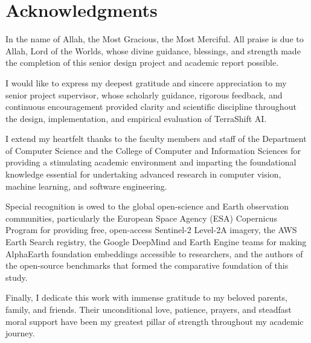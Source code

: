 \chapter*{Acknowledgments}

In the name of Allah, the Most Gracious, the Most Merciful. All praise is due to Allah, Lord of the Worlds, whose divine guidance, blessings, and strength made the completion of this senior design project and academic report possible.

I would like to express my deepest gratitude and sincere appreciation to my senior project supervisor, whose scholarly guidance, rigorous feedback, and continuous encouragement provided clarity and scientific discipline throughout the design, implementation, and empirical evaluation of TerraShift AI.

I extend my heartfelt thanks to the faculty members and staff of the Department of Computer Science and the College of Computer and Information Sciences for providing a stimulating academic environment and imparting the foundational knowledge essential for undertaking advanced research in computer vision, machine learning, and software engineering.

Special recognition is owed to the global open-science and Earth observation communities, particularly the European Space Agency (ESA) Copernicus Program for providing free, open-access Sentinel-2 Level-2A imagery, the AWS Earth Search registry, the Google DeepMind and Earth Engine teams for making AlphaEarth foundation embeddings accessible to researchers, and the authors of the open-source benchmarks that formed the comparative foundation of this study.

Finally, I dedicate this work with immense gratitude to my beloved parents, family, and friends. Their unconditional love, patience, prayers, and steadfast moral support have been my greatest pillar of strength throughout my academic journey.
\newpage
